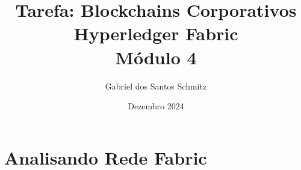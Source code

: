 \documentclass[letterpaper,11pt,leqno]{article}
\begin{document}
\title{Tarefa: Blockchains Corporativos\\ Hyperledger Fabric\\ Módulo 4}

\author{Gabriel dos Santos Schmitz}

\date{Dezembro 2024}

\begin{titlepage}

	\maketitle

\end{titlepage}

\section{Analisando Rede Fabric}
\end{document}
